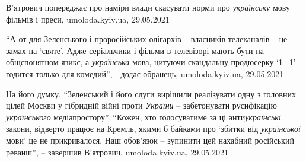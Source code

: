 В'ятрович попереджає про наміри влади скасувати норми про \emph{українську} мову
фільмів і преси, umoloda.kyiv.ua, 29.05.2021

\enquote{А от для Зеленського і проросійських олігархів – власників телеканалів
– це замах на \enquote{святе}. Адже серіальчики і фільми в телевізорі мають
бути на общєпонятном язикє, а \emph{українська} мова, цитуючи скандальну
продюсерку \enquote{1+1} годится только для комедий}, - додає обранець,
umoloda.kyiv.ua, 29.05.2021

На його думку, \enquote{Зеленський і його слуги вирішили реалізувати одну з
головних цілей Москви у гібридній війні проти \emph{України} – забетонувати
русифікацію \emph{українського} медіапростору}.  \enquote{Кожен, хто голосуватиме за
ці анти\emph{українські} закони, відверто працює на Кремль, якими б байками про
\enquote{збитки від \emph{української} мови} це не прикривалося. Наш обов'язок –
зупинити цей нахабний російський реванш}, – завершив В'ятрович,
umoloda.kyiv.ua, 29.05.2021
